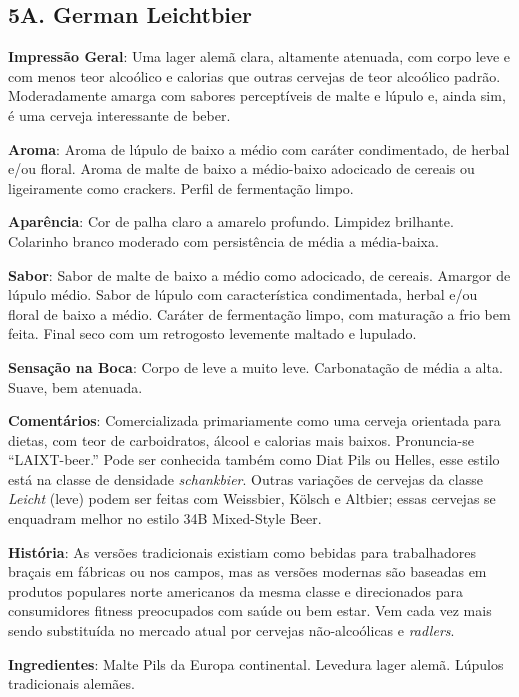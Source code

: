 \subsection*{5A. German Leichtbier}
\textbf{Impressão Geral}: Uma lager alemã clara, altamente atenuada, com corpo leve e com menos teor alcoólico e calorias que outras cervejas de teor alcoólico padrão. Moderadamente amarga com sabores perceptíveis de malte e lúpulo e, ainda sim, é uma cerveja interessante de beber.

\textbf{Aroma}: Aroma de lúpulo de baixo a médio com caráter condimentado, de herbal e/ou floral. Aroma de malte de baixo a médio-baixo adocicado de cereais ou ligeiramente como crackers. Perfil de fermentação limpo.

\textbf{Aparência}: Cor de palha claro a amarelo profundo. Limpidez brilhante. Colarinho branco moderado com persistência de média a média-baixa.

\textbf{Sabor}: Sabor de malte de baixo a médio como adocicado, de cereais. Amargor de lúpulo médio. Sabor de lúpulo com característica condimentada, herbal e/ou floral de baixo a médio. Caráter de fermentação limpo, com maturação a frio bem feita. Final seco com um retrogosto levemente maltado e lupulado.

\textbf{Sensação na Boca}: Corpo de leve a muito leve. Carbonatação de média a alta. Suave, bem atenuada.

\textbf{Comentários}: Comercializada primariamente como uma cerveja orientada para dietas, com teor de carboidratos, álcool e calorias mais baixos. Pronuncia-se “LAIXT-beer.” Pode ser conhecida também como Diat Pils ou Helles, esse estilo está na classe de densidade \textit{schankbier}. Outras variações de cervejas da classe \textit{Leicht} (leve) podem ser feitas com Weissbier, Kölsch e Altbier; essas cervejas se enquadram melhor no estilo 34B Mixed-Style Beer.

\textbf{História}: As versões tradicionais existiam como bebidas para trabalhadores braçais em fábricas ou nos campos, mas as versões modernas são baseadas em produtos populares norte americanos da mesma classe e direcionados para consumidores fitness preocupados com saúde ou bem estar. Vem cada vez mais sendo substituída no mercado atual por cervejas não-alcoólicas e \textit{radlers}.

\textbf{Ingredientes}: Malte Pils da Europa continental. Levedura lager alemã. Lúpulos tradicionais alemães.

